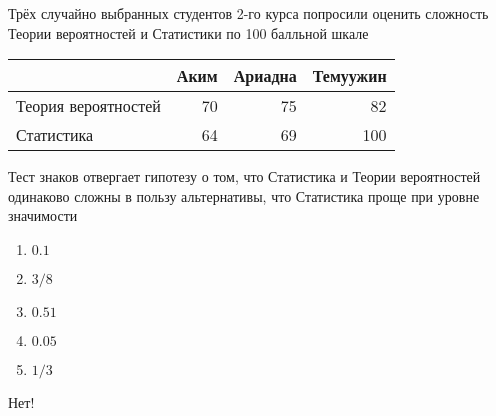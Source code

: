\documentclass[t]{beamer}
\begin{document}
 \begin{frame} \label{46-No} 
\begin{block}{46} 

Трёх случайно выбранных студентов 2-го курса попросили оценить сложность Теории вероятностей и Статистики по 100 балльной шкале

\vspace{5mm}
\begin{tabular}{lrrr}
  \toprule
   & Аким & Ариадна & Темуужин \\
   \midrule
   Теория вероятностей & 70 & 75 & 82 \\
   Статистика & 64 & 69 & 100 \\
  \bottomrule
\end{tabular}
\vspace{5mm}


Тест знаков отвергает гипотезу о том, что Статистика и Теории вероятностей одинаково сложны в пользу альтернативы, что Статистика проще при уровне значимости


 \end{block} 
\begin{enumerate} 
\item[] \hyperlink{46-No}{\beamergotobutton{} $0.1$}
\item[] \hyperlink{46-No}{\beamergotobutton{} $3/8$}
\item[] \hyperlink{46-Yes}{\beamergotobutton{} $0.51$}
\item[] \hyperlink{46-No}{\beamergotobutton{} $0.05$}
\item[] \hyperlink{46-No}{\beamergotobutton{} $1/3$}
\end{enumerate} 

 \alert{Нет!} 
\end{frame} 
\end{document}
